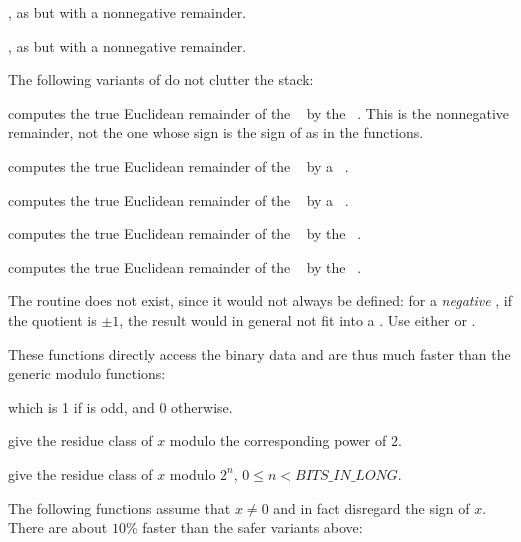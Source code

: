 , as  but with a
nonnegative remainder.

, as  but with a
nonnegative remainder.

 The following variants of  do not
clutter the stack:

 computes the true Euclidean
remainder of the ~ by the ~. This is the
nonnegative remainder, not the one whose sign is the sign of 
as in the  functions.

 computes the true Euclidean
remainder of the ~ by a ~.

 computes the true Euclidean
remainder of the ~ by a ~.

 computes the true Euclidean
remainder of the ~ by the ~.

 computes the true Euclidean
remainder of the ~ by the ~.

The routine  does not exist, since it would not always be
defined: for a \emph{negative} , if the quotient is $\pm1$, the result
 would in general not fit into a . Use either
 or .

These functions directly access the binary data and are thus much faster than
the generic modulo functions:

 which is 1 if  is odd, and 0 otherwise.






 give the residue class of $x$ modulo the
corresponding power of $2$.

 give the residue class of $x$ modulo
$2^n$, $0 \leq n < BITS\_IN\_LONG$.

The following functions assume that $x\neq 0$ and in fact disregard the
sign of $x$. There are about $10\%$ faster than the safer variants above:

